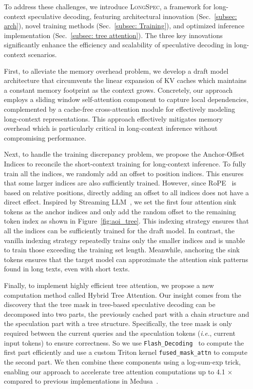 To address these challenges, we introduce \textsc{LongSpec}, a framework for long-context speculative decoding, featuring architectural innovation (Sec.~\ref{subsec: arch}), novel training methods (Sec.~\ref{subsec: Training}), and optimized inference implementation (Sec.~\ref{subsec: tree attention}).
The three key innovations significantly enhance the efficiency and scalability of speculative decoding in long-context scenarios.

First, to alleviate the memory overhead problem, we develop a draft model architecture that circumvents the linear expansion of KV caches which maintains a constant memory footprint as the context grows. 
Concretely, our approach employs a sliding window self-attention component to capture local dependencies, complemented by a cache-free cross-attention module for effectively modeling long-context representations. 
This approach effectively mitigates memory overhead which is particularly critical in long-context inference without compromising performance.  

Next, to handle the training discrepancy problem, we propose the Anchor-Offset Indices to reconcile the short-context training for long-context inference. 
To fully train all the indices, we randomly add an offset to position indices. 
This ensures that some larger indices are also sufficiently trained.
However, since RoPE~\cite{su2024roformer} is based on relative positions, directly adding an offset to all indices does not have a direct effect. 
Inspired by Streaming LLM~\cite{xiao2024efficient}, we set the first four attention sink tokens as the anchor indices and only add the random offset to the remaining token index as shown in Figure~\ref{fig:aoi_tree}.
This indexing strategy ensures that all the indices can be sufficiently trained for the draft model. 
In contrast, the vanilla indexing strategy repeatedly trains only the smaller indices and is unable to train those exceeding the training set length.
Meanwhile, anchoring the sink tokens ensures that the target model can approximate the attention sink patterns found in long texts, even with short texts.


Finally, to implement highly efficient tree attention, we propose a new computation method called Hybrid Tree Attention. 
Our insight comes from the discovery that the tree mask in tree-based speculative decoding can be decomposed into two parts, the previously cached part with a chain structure and the speculation part with a tree structure. Specifically, the tree mask is only required between the current queries and the speculation tokens (\emph{i.e.}, current input tokens) to ensure correctness.
So we use \texttt{Flash\_Decoding}~\cite{dao2024flash} to compute the first part efficiently and use a custom Triton kernel \texttt{fused\_mask\_attn} to compute the second part. 
We then combine these components using a log-sum-exp trick, enabling our approach to accelerate tree attention computations up to 4.1 $\times$ compared to previous implementations in Medusa~\cite{cai2024medusa}.

